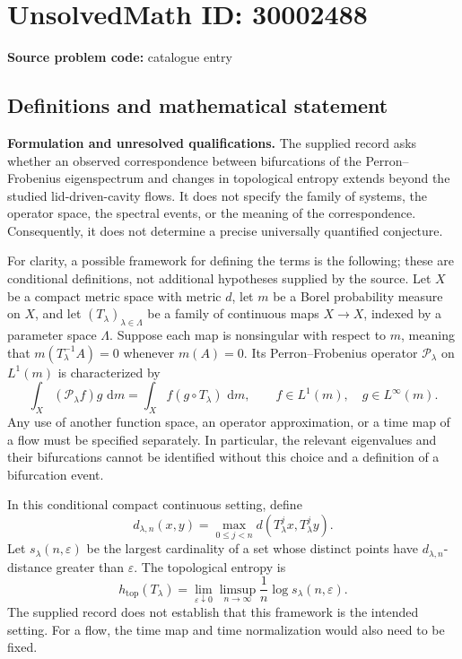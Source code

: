 \documentclass[11pt]{article}
\newcommand{\dd}{\,\mathrm{d}}
\begin{document}
\section*{UnsolvedMath ID: 30002488}
\textbf{Source problem code:} catalogue entry
\subsection{Definitions and mathematical statement}
\textbf{Formulation and unresolved qualifications.} The supplied record asks whether an observed correspondence between bifurcations of the Perron--Frobenius eigenspectrum and changes in topological entropy extends beyond the studied lid-driven-cavity flows. It does not specify the family of systems, the operator space, the spectral events, or the meaning of the correspondence. Consequently, it does not determine a precise universally quantified conjecture.

For clarity, a possible framework for defining the terms is the following; these are conditional definitions, not additional hypotheses supplied by the source. Let \(X\) be a compact metric space with metric \(d\), let \(m\) be a Borel probability measure on \(X\), and let \((T_\lambda)_{\lambda\in\Lambda}\) be a family of continuous maps \(X\to X\), indexed by a parameter space \(\Lambda\). Suppose each map is nonsingular with respect to \(m\), meaning that \(m(T_\lambda^{-1}A)=0\) whenever \(m(A)=0\). Its Perron--Frobenius operator \(\mathcal P_\lambda\) on \(L^1(m)\) is characterized by
\[
\int_X (\mathcal P_\lambda f)g\,\dd m
=\int_X f(g\circ T_\lambda)\,\dd m,
\qquad f\in L^1(m),\quad g\in L^\infty(m).
\]
Any use of another function space, an operator approximation, or a time map of a flow must be specified separately. In particular, the relevant eigenvalues and their bifurcations cannot be identified without this choice and a definition of a bifurcation event.

In this conditional compact continuous setting, define
\[
d_{\lambda,n}(x,y)=\max_{0\leq j<n}d(T_\lambda^j x,T_\lambda^j y).
\]
Let \(s_\lambda(n,\varepsilon)\) be the largest cardinality of a set whose distinct points have \(d_{\lambda,n}\)-distance greater than \(\varepsilon\). The topological entropy is
\[
h_{\mathrm{top}}(T_\lambda)
=\lim_{\varepsilon\downarrow0}\limsup_{n\to\infty}
\frac{1}{n}\log s_\lambda(n,\varepsilon).
\]
The supplied record does not establish that this framework is the intended setting. For a flow, the time map and time normalization would also need to be fixed.
\end{document}

